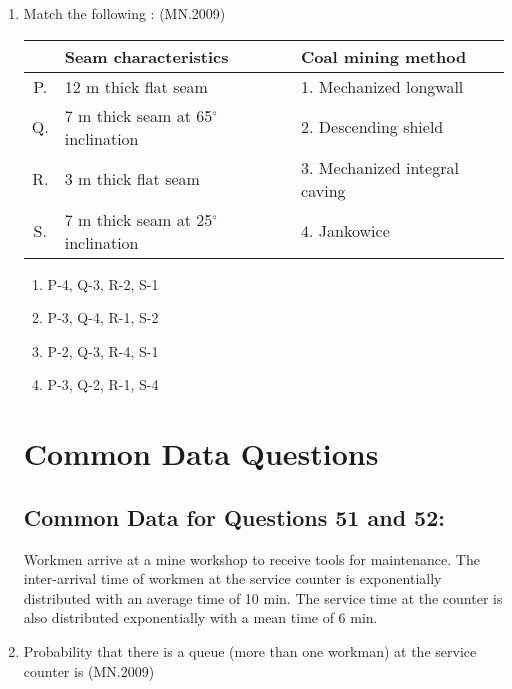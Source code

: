\documentclass[journal]{IEEEtran}
\numberwithin{equation}{enumi}
\numberwithin{figure}{enumi}
\begin{document}
\begin{enumerate}
\item Match the following :
\hfill{(MN.2009)}
\begin{center}
\begin{tabular}{|c|l|l|}
\hline
& \textbf{Seam characteristics} & \textbf{Coal mining method} \\
\hline
P. & 12 m thick flat seam & 1. Mechanized longwall \\
Q. & 7 m thick seam at 65$^\circ$ inclination & 2. Descending shield \\
R. & 3 m thick flat seam & 3. Mechanized integral caving \\
S. & 7 m thick seam at 25$^\circ$ inclination & 4. Jankowice \\
\hline
\end{tabular}
\end{center}

\begin{enumerate}[label=(\Alph*)]
\item P-4, Q-3, R-2, S-1
\item P-3, Q-4, R-1, S-2
\item P-2, Q-3, R-4, S-1
\item P-3, Q-2, R-1, S-4
\end{enumerate}

\section*{Common Data Questions}

\subsection*{Common Data for Questions 51 and 52:}

Workmen arrive at a mine workshop to receive tools for maintenance. The inter-arrival time of workmen at the service counter is exponentially distributed with an average time of 10 min. The service time at the counter is also distributed exponentially with a mean time of 6 min.

\item Probability that there is a queue (more than one workman) at the service counter is
 \hfill{(MN.2009)}
\begin{enumerate}[label=(\Alph*)]
\end{enumerate}


\end{enumerate}
\end{document}
